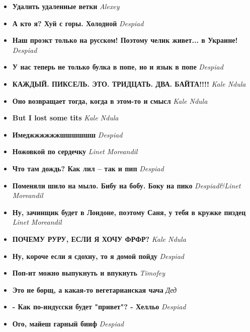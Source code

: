 \documentclass[12pt,a4paper]{article}
\newcommand{\entry}[2] {\textbf{#1} \textemdash \emph{#2}}
\newcommand{\kn}{Kale Ndula}
\newcommand{\lm}{Linet Moreandil}
\newcommand{\dd}{Despiad}
\newcommand{\al}{Alexey}
\begin{document}
\begin{itemize}
\item \entry{Удалить удаленные ветки}{\al}
\item \entry{А кто я? Хуй с горы. Холодной}{\dd}
\item \entry{Наш проэкт только на русском! Поэтому челик живет... в Украине!}{\dd}
\item \entry{У нас теперь не только булка в попе, но и язык в попе}{\dd}
\item \entry{КАЖДЫЙ. ПИКСЕЛЬ. ЭТО. ТРИДЦАТЬ. ДВА. БАЙТА!!!!}{\kn}
\item \entry{Оно возвращает тогда, когда в этом-то и смысл}{\kn}
\item \entry{But I lost some tits}{\kn}
\item \entry{Имеджжжжжжшшшшшш}{\dd}
\item \entry{Ножовкой по сердечку}{\lm}
\item \entry{Что там дождь? Как лил -- так и пип}{\dd}
\item \entry{Поменяли шило на мыло. Бибу на бобу. Боку на пико}{\dd\&\lm}
\item \entry{Ну, зачинщик будет в Лондоне, поэтому Саня, у тебя в кружке пиздец}{\lm}
\item \entry{ПОЧЕМУ РУРУ, ЕСЛИ Я ХОЧУ ФРФР?}{\kn}
\item \entry{Ну, короче если я сдохну, то я домой пойду}{\dd}
\item \entry{Поп-ит можно выпукнуть и впукнуть}{Timofey}
\item \entry{Это не борщ, а какая-то вегетарианская чача}{Дед}
\item \entry{- Как по-индусски будет "привет"? - Хелльо}{\dd}
\item \entry{Ого, майеш гарный бииф}{\dd}

\end{itemize}
\end{document}
